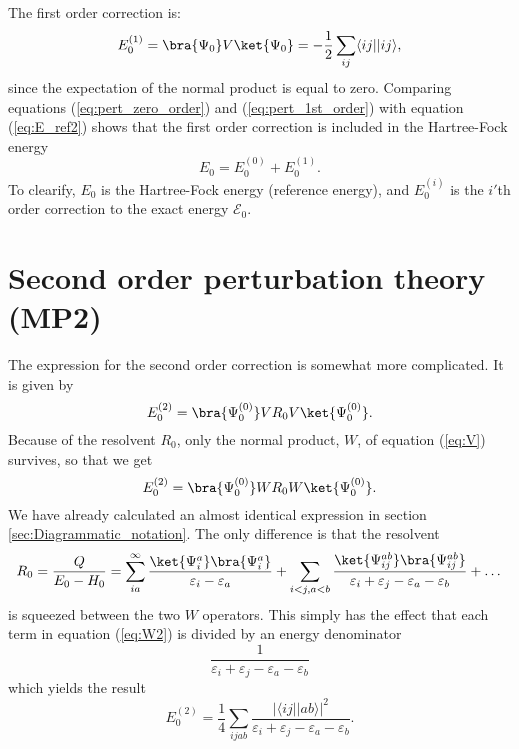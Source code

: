 The first order correction is:
\begin{equation}
\label{eq:pert_1st_order}
 E^{(1)}_0 = \bra{\Psi_0}V\ket{\Psi_0} = - \frac{1}{2}\sum_{ij}\langle ij||ij\rangle,
\end{equation}
since the expectation of the normal product is equal to zero. Comparing equations (\ref{eq:pert_zero_order}) and (\ref{eq:pert_1st_order}) with equation
(\ref{eq:E_ref2}) shows that the first order correction is included in the Hartree-Fock energy
\begin{equation}
 E_0 = E^{(0)}_0 + E^{(1)}_0.
\end{equation}
To clearify, $E_0$ is the Hartree-Fock energy (reference energy), and $E_0^{(i)}$ is the $i'$th order correction to the exact energy $\mathscr E_0$.

\section{Second order perturbation theory (MP2)}
The expression for the second order correction is somewhat more complicated. It is given by
\begin{equation}
 E^{(2)}_0 = \bra{\Psi^{(0)}_0}V R_0 V\ket{\Psi^{(0)}_0}.
\end{equation}
Because of the resolvent $R_0$, only the normal product, $W$, of equation (\ref{eq:V}) survives, so that we get
\begin{equation}
 E^{(2)}_0 = \bra{\Psi^{(0)}_0}W R_0 W\ket{\Psi^{(0)}_0}.
\end{equation}
We have already calculated an almost identical expression in section \ref{sec:Diagrammatic_notation}. The only difference is that the resolvent
\begin{equation}
 R_0 = \frac{Q}{E_0 - H_0} = \sum_{ia}^\infty \frac{\ket{\Psi^a_i}\bra{\Psi^a_i}}{\varepsilon_i - \varepsilon_a}
                             + \sum_{i<j,a<b}\frac{\ket{\Psi^{ab}_{ij}}\bra{\Psi^{ab}_{ij}}}{\varepsilon_i + \varepsilon_j - \varepsilon_a - \varepsilon_b} + \dots
\end{equation}
is squeezed between the two $W$ operators. This simply has the effect that each term in equation (\ref{eq:W2}) is divided by an energy denominator
\begin{equation}
 \frac{1}{\varepsilon_i + \varepsilon_j - \varepsilon_a - \varepsilon_b}
\end{equation}
which yields the result
\begin{equation}
\label{eq:MP2}
 E^{(2)}_0 = \frac{1}{4}\sum_{ijab}\frac{|\langle ij||ab\rangle|^2}{\varepsilon_i+\varepsilon_j-\varepsilon_a-\varepsilon_b}.
\end{equation}
